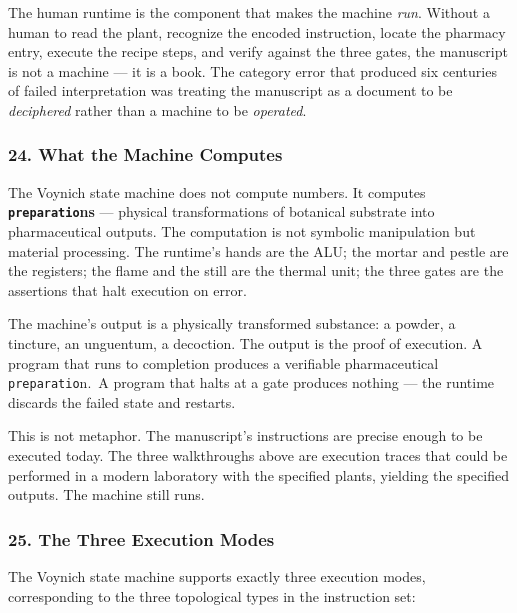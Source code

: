 The human runtime is the component that makes the machine \emph{run}.
Without a human to read the plant, recognize the encoded instruction,
locate the pharmacy entry, execute the recipe steps, and verify against
the three gates, the manuscript is not a machine --- it is a book. The
category error that produced six centuries of failed interpretation was
treating the manuscript as a document to be \emph{deciphered} rather
than a machine to be \emph{operated}.

\hypertarget{what-the-machine-computes}{%
\subsubsection{24. What the Machine
Computes}\label{what-the-machine-computes}}

The Voynich state machine does not compute numbers. It computes
\textbf{\texttt{preparatio}ns} --- physical transformations of botanical
substrate into pharmaceutical outputs. The computation is not symbolic
manipulation but material processing. The runtime's hands are the ALU;
the mortar and pestle are the registers; the flame and the still are the
thermal unit; the three gates are the assertions that halt execution on
error.

The machine's output is a physically transformed substance: a powder, a
tincture, an unguentum, a decoction. The output is the proof of
execution. A program that runs to completion produces a verifiable
pharmaceutical \texttt{preparatio}n.~A program that halts at a gate
produces nothing --- the runtime discards the failed state and restarts.

This is not metaphor. The manuscript's instructions are precise enough
to be executed today. The three walkthroughs above are execution traces
that could be performed in a modern laboratory with the specified
plants, yielding the specified outputs. The machine still runs.

\hypertarget{the-three-execution-modes}{%
\subsubsection{25. The Three Execution
Modes}\label{the-three-execution-modes}}

The Voynich state machine supports exactly three execution modes,
corresponding to the three topological types in the instruction set:


